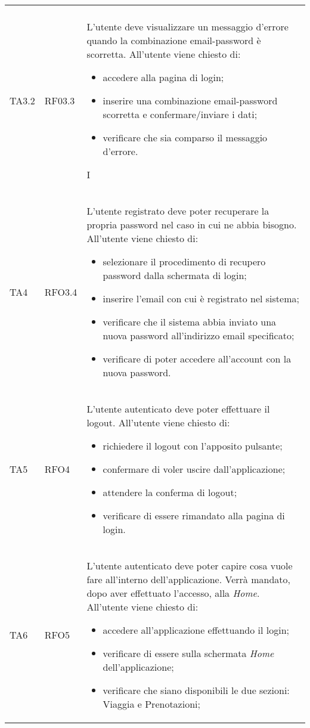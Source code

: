 \begin{longtable}{ >{\centering}p{} >{\centering}p{} >{\centering}p{}
			}
\begin{itemize}
		 \end{itemize} 	\tabularnewline
		 TA3.2 & RF03.3 &	L'utente deve visualizzare un messaggio d'errore quando la combinazione email-password è scorretta. All'utente viene chiesto di:
		 \begin{itemize}
		 	\item accedere alla pagina di login;
		 	\item inserire una combinazione email-password scorretta e confermare/inviare i dati;
		 	\item verificare che sia comparso il messaggio d'errore.
		 \end{itemize}  I	\tabularnewline
		 TA4 & RFO3.4	&	L'utente registrato deve poter recuperare la propria password nel caso in cui ne abbia bisogno. All'utente viene chiesto di:
		 \begin{itemize}
		 	\item selezionare il procedimento di recupero password dalla schermata di login;
		 	\item inserire l'email con cui è registrato nel sistema;
		 	\item verificare che il sistema abbia inviato una nuova password all'indirizzo email specificato;
		 	\item verificare di poter accedere all'account con la nuova password.
		 \end{itemize}		\tabularnewline
		 TA5	& RFO4 &	L'utente autenticato deve poter effettuare il logout. All'utente viene chiesto di:
		 \begin{itemize}
		 	\item richiedere il logout con l'apposito pulsante;
		 	\item confermare di voler uscire dall'applicazione;
		 	\item attendere la conferma di logout;
		 	\item verificare di essere rimandato alla pagina di login.
		 \end{itemize} 	\tabularnewline
	 	 TA6	& RFO5 & L'utente autenticato deve poter capire cosa vuole fare all'interno dell'applicazione. Verrà mandato, dopo aver effettuato l'accesso, alla \textit{Home}. 
	 	 All'utente viene chiesto di:
	 	 \begin{itemize}
	 	 	\item accedere all'applicazione effettuando il login;
	 	 	\item verificare di essere sulla schermata \textit{Home} dell'applicazione;
	 	 	\item verificare che siano disponibili le due sezioni: Viaggia e Prenotazioni;

\end{itemize}
\end{longtable}
